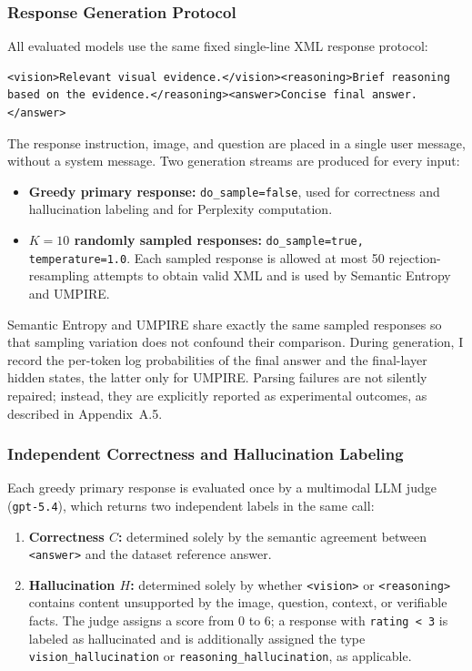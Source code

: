 \subsubsection{Response Generation Protocol}
\label{subsubsec:generation_protocol}

All evaluated models use the same fixed single-line XML response protocol:

\begin{lstlisting}
<vision>Relevant visual evidence.</vision><reasoning>Brief reasoning based on the evidence.</reasoning><answer>Concise final answer.</answer>
\end{lstlisting}

The response instruction, image, and question are placed in a single user message, without a system message. Two generation streams are produced for every input:

\begin{itemize}[leftmargin=2em]
    \item \textbf{Greedy primary response:} \texttt{do\_sample=false}, used for correctness and hallucination labeling and for Perplexity computation.
    \item \textbf{$K=10$ randomly sampled responses:} \texttt{do\_sample=true, temperature=1.0}. Each sampled response is allowed at most 50 rejection-resampling attempts to obtain valid XML and is used by Semantic Entropy and UMPIRE.
\end{itemize}

Semantic Entropy and UMPIRE share exactly the same sampled responses so that sampling variation does not confound their comparison. During generation, I record the per-token log probabilities of the final answer and the final-layer hidden states, the latter only for UMPIRE. Parsing failures are not silently repaired; instead, they are explicitly reported as experimental outcomes, as described in Appendix~A.5.

\subsubsection{Independent Correctness and Hallucination Labeling}
\label{subsubsec:independent_labels}

Each greedy primary response is evaluated once by a multimodal LLM judge (\texttt{gpt-5.4}), which returns two independent labels in the same call:

\begin{enumerate}[leftmargin=2em]
    \item \textbf{Correctness $C$:} determined solely by the semantic agreement between \texttt{<answer>} and the dataset reference answer.
    \item \textbf{Hallucination $H$:} determined solely by whether \texttt{<vision>} or \texttt{<reasoning>} contains content unsupported by the image, question, context, or verifiable facts. The judge assigns a score from 0 to 6; a response with \texttt{rating < 3} is labeled as hallucinated and is additionally assigned the type \texttt{vision\_hallucination} or \texttt{reasoning\_hallucination}, as applicable.
\end{enumerate}

